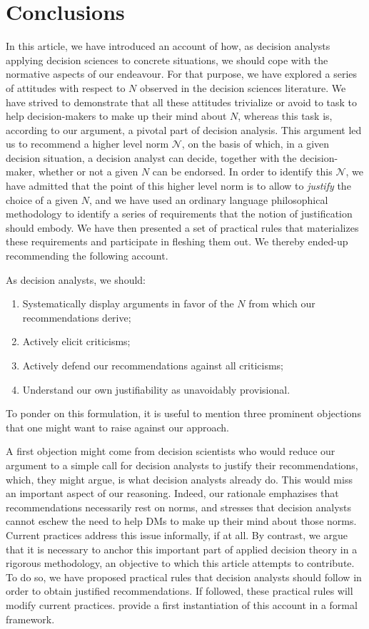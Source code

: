 \documentclass[preprint, french, english, 11pt, authoryear]{elsarticle}%
\newcommand{\adv}{\mathscr{N}}
\begin{document}
\section{Conclusions}
In this article, we have introduced an account of how, as decision analysts applying decision sciences to concrete situations, we should cope with the normative aspects of our endeavour. For that purpose, we have explored a series of attitudes with respect to $N$ observed in the decision sciences literature. We have strived to demonstrate that all these attitudes trivialize or avoid to task to help decision-makers to make up their mind about $N$, whereas this task is, according to our argument, a pivotal part of decision analysis. This argument led us to recommend a higher level norm $\adv$, on the basis of which, in a given decision situation, a decision analyst can decide, together with the decision-maker, whether or not a given $N$ can be endorsed. In order to identify this $\adv$, we have admitted that the point of this higher level norm is to allow to \emph{justify} the choice of a given $N$, and we have used an ordinary language philosophical methodology to identify a series of requirements that the notion of justification should embody. We have then presented a set of practical rules that materializes these requirements and participate in fleshing them out. We thereby ended-up recommending the following account.

As decision analysts, we should:
\begin{enumerate}[label=\roman*.]
	\item Systematically display arguments in favor of the $N$ from which our recommendations derive;
	\item Actively elicit criticisms;
	\item Actively defend our recommendations against all criticisms;
	\item Understand our own justifiability as unavoidably provisional.
\end{enumerate}

To ponder on this formulation, it is useful to mention three prominent objections that one might want to raise against our approach.

A first objection might come from decision scientists who would reduce our argument to a simple call for decision analysts to justify their recommendations, which, they might argue, is what decision analysts already do. This would miss an important aspect of our reasoning. Indeed, our rationale emphazises that recommendations necessarily rest on norms, and stresses that decision analysts cannot eschew the need to help \acp{DM} to make up their mind about those norms. Current practices address this issue informally, if at all. By contrast, we argue that it is necessary to anchor this important part of applied decision theory in a rigorous methodology, an objective to which this article attempts to contribute. To do so, we have proposed practical rules that decision analysts should follow in order to obtain justified recommendations. If followed, these practical rules will modify current practices. \citet{cailloux_formal_2018} provide a first instantiation of this account in a formal framework.
\end{document}
